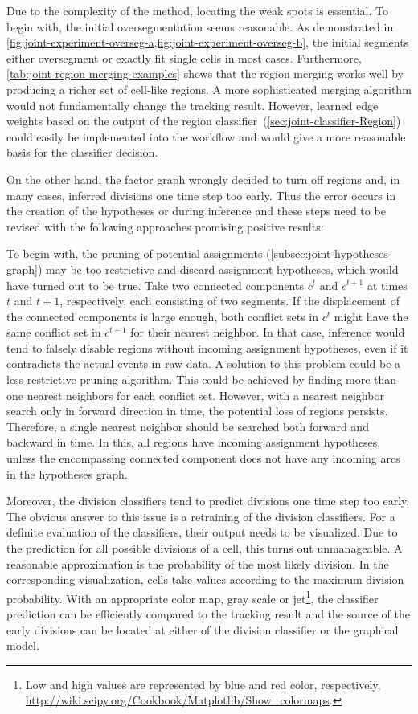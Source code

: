 Due to the complexity of the method, locating the weak spots is essential. To begin with, the
initial oversegmentation seems reasonable. As demonstrated in
\cref{fig:joint-experiment-overseg-a,fig:joint-experiment-overseg-b}, the initial segments
either oversegment or exactly fit single cells in most cases. Furthermore,
\cref{tab:joint-region-merging-examples} shows that the region merging works well by producing a
richer set of cell-like regions. A more sophisticated merging algorithm would not fundamentally
change the tracking result. However, learned edge weights based on the output of the region
classifier~(\cref{sec:joint-classifier-Region}) could easily be implemented into the workflow
and would give a more reasonable basis for the classifier decision.

On the other hand, the factor graph wrongly decided to turn off regions and, in many cases,
inferred divisions one time step too early. Thus the error occurs in the creation of the
hypotheses or during inference and these steps need to be revised with the following approaches
promising positive results:

To begin with, the pruning of potential assignments (\cref{subsec:joint-hypotheses-graph}) may be too
restrictive and discard assignment hypotheses, which would have turned out to be true. Take two
connected components $c^t$ and $c^{t+1}$ at times $t$ and $t+1$, respectively, each consisting
of two segments. If the displacement of the connected components is large enough, both conflict
sets in $c^t$ might have the same conflict set in $c^{t+1}$ for their nearest neighbor. In that
case, inference would tend to falsely disable regions without incoming assignment hypotheses,
even if it contradicts the actual events in raw data. A solution to this problem could be a less
restrictive pruning algorithm. This could be achieved by finding more than one nearest neighbors
for each conflict set. However, with a nearest neighbor search only in forward direction in
time, the potential loss of regions persists. Therefore, a single nearest neighbor should be
searched both forward and backward in time. In this, all regions have incoming assignment
hypotheses, unless the encompassing connected component does not have any incoming arcs in the
hypotheses graph.

Moreover, the division classifiers tend to predict divisions one time step too early. The obvious
answer to this issue is a retraining of the division classifiers. For a definite evaluation of the
classifiers, their output needs to be visualized. Due to the prediction for all possible divisions
of a cell, this turns out unmanageable. A reasonable approximation is the probability of the most
likely division. In the corresponding visualization, cells take values according to the maximum
division probability. With an appropriate color map, \eg gray scale or jet\footnote{Low and high
    values are represented by blue and red color, respectively,
    \\\cf\url{http://wiki.scipy.org/Cookbook/Matplotlib/Show_colormaps}.}, the classifier prediction
can be efficiently compared to the tracking result and the source of the early divisions can be
located at either of the division classifier or the graphical model.

